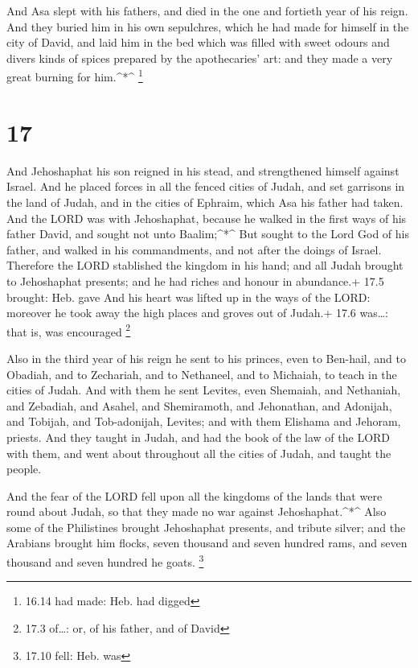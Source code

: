  And Asa slept with his fathers, and died in the one and
fortieth year of his reign.  And they buried him in his own
sepulchres, which he had made for himself in the city of David, and laid
him in the bed which was filled with sweet odours and divers kinds of
spices prepared by the apothecaries' art: and they made a very great
burning for him.\^{}*\^{} \footnote{16.14 had made: Heb. had digged}

\hypertarget{section-16}{%
\section{17}\label{section-16}}

 And Jehoshaphat his son reigned in his stead, and
strengthened himself against Israel.  And he placed forces
in all the fenced cities of Judah, and set garrisons in the land of
Judah, and in the cities of Ephraim, which Asa his father had taken.
 And the LORD was with Jehoshaphat, because he walked in the
first ways of his father David, and sought not unto Baalim;\^{}*\^{}
 But sought to the Lord God of his father, and walked in his
commandments, and not after the doings of Israel.  Therefore
the LORD stablished the kingdom in his hand; and all Judah brought to
Jehoshaphat presents; and he had riches and honour in abundance.+ 17.5
brought: Heb. gave  And his heart was lifted up in the ways
of the LORD: moreover he took away the high places and groves out of
Judah.+ 17.6 was\ldots: that is, was encouraged \footnote{17.3 of\ldots:
  or, of his father, and of David}

 Also in the third year of his reign he sent to his princes,
even to Ben-hail, and to Obadiah, and to Zechariah, and to Nethaneel,
and to Michaiah, to teach in the cities of Judah.  And with
them he sent Levites, even Shemaiah, and Nethaniah, and Zebadiah, and
Asahel, and Shemiramoth, and Jehonathan, and Adonijah, and Tobijah, and
Tob-adonijah, Levites; and with them Elishama and Jehoram, priests.
 And they taught in Judah, and had the book of the law of
the LORD with them, and went about throughout all the cities of Judah,
and taught the people.

 And the fear of the LORD fell upon all the kingdoms of the
lands that were round about Judah, so that they made no war against
Jehoshaphat.\^{}*\^{}  Also some of the Philistines brought
Jehoshaphat presents, and tribute silver; and the Arabians brought him
flocks, seven thousand and seven hundred rams, and seven thousand and
seven hundred he goats. \footnote{17.10 fell: Heb. was}

